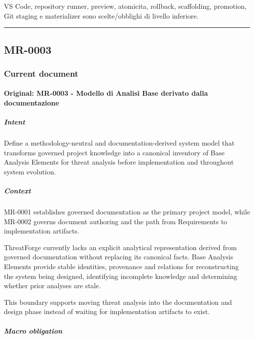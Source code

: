 \documentclass[
  10pt,
]{article}
\begin{document}
VS Code, repository runner, preview, atomicita, rollback, scaffolding,
promotion, Git staging e materializer sono scelte/obblighi di livello
inferiore.

\begin{center}\rule{0.5\linewidth}{0.5pt}\end{center}

\subsection{MR-0003}\label{mr-0003}

\subsubsection{Current document}\label{current-document-2}

\paragraph{Original: MR-0003 - Modello di Analisi Base derivato dalla
documentazione}\label{original-mr-0003---modello-di-analisi-base-derivato-dalla-documentazione}

\subparagraph{Intent}\label{intent-4}

Define a methodology-neutral and documentation-derived system model that
transforms governed project knowledge into a canonical inventory of Base
Analysis Elements for threat analysis before implementation and
throughout system evolution.

\subparagraph{Context}\label{context-4}

MR-0001 establishes governed documentation as the primary project model,
while MR-0002 governs document authoring and the path from Requirements
to implementation artifacts.

ThreatForge currently lacks an explicit analytical representation
derived from governed documentation without replacing its canonical
facts. Base Analysis Elements provide stable identities, provenance and
relations for reconstructing the system being designed, identifying
incomplete knowledge and determining whether prior analyses are stale.

This boundary supports moving threat analysis into the documentation and
design phase instead of waiting for implementation artifacts to exist.

\subparagraph{Macro obligation}\label{macro-obligation-2}
\end{document}
